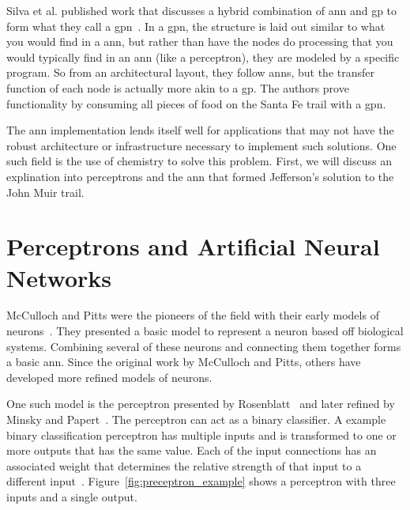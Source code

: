 Silva et al. published work that discusses a hybrid combination of \gls{ann} and \gls{gp} to form what they call a \gls{gpn}~\cite{Silva1999-kw}. In a \gls{gpn}, the structure is laid out similar to what you would find in a \gls{ann}, but rather than have the nodes do processing that you would typically find in an \gls{ann} (like a perceptron), they are modeled by a specific program. So from an architectural layout, they follow \glspl{ann}, but the transfer function of each node is actually more akin to a \gls{gp}. The authors prove functionality by consuming all pieces of food on the Santa Fe trail with a \gls{gpn}.

The \gls{ann} implementation lends itself well for applications that may not have the robust architecture or infrastructure necessary to implement such solutions. One such field is the use of chemistry to solve this problem. First, we will discuss an explination into perceptrons and the \gls{ann} that formed Jefferson's solution to the John Muir trail.

\section{Perceptrons and Artificial Neural Networks}
McCulloch and Pitts were the pioneers of the field with their early models of neurons~\cite{McCulloch1943-li}. They presented a basic model to represent a neuron based off biological systems. Combining several of these neurons and connecting them together forms a basic \gls{ann}. Since the original work by McCulloch and Pitts, others have developed more refined models of neurons.

One such model is the perceptron presented by Rosenblatt~\cite{Rosenblatt1958-yq} and later refined by Minsky and Papert~\cite{Minsky1987-zx}. The perceptron can act as a binary classifier. A example binary classification perceptron has multiple inputs and is transformed to one or more outputs that has the same value. Each of the input connections has an associated weight that determines the relative strength of that input to a different input~\cite{Rojas1996-yd}. Figure~\ref{fig:preceptron_example} shows a perceptron with three inputs and a single output.

